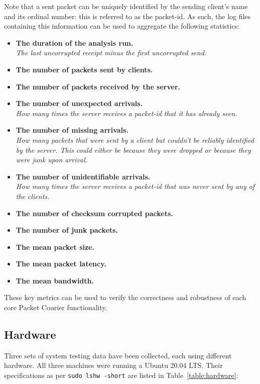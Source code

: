 Note that a sent packet can be uniquely identified by the sending client's name and its ordinal number: this is
referred to as the packet-id. As such, the log files containing this information can be used to aggregate the
following statistics:
\begin{itemize}
    \item \textbf{The duration of the analysis run.} \\
    \emph{The last uncorrupted receipt minus the first uncorrupted send.}
    \item \textbf{The number of packets sent by clients.}
    \item \textbf{The number of packets received by the server.}
    \item \textbf{The number of unexpected arrivals.} \\
    \emph{How many times the server receives a packet-id that it has already seen.}
    \item \textbf{The number of missing arrivals.} \\
    \emph{How many packets that were sent by a client but couldn't be reliably identified by the server. This could
    either be because they were dropped or because they were junk upon arrival.}
    \item \textbf{The number of unidentifiable arrivals.} \\
    \emph{How many times the server receives a packet-id that was never sent by any of the clients.}
    \item \textbf{The number of checksum corrupted packets.}
    \item \textbf{The number of junk packets.}
    \item \textbf{The mean packet size.}
    \item \textbf{The mean packet latency.}
    \item \textbf{The mean bandwidth.}
\end{itemize}

These key metrics can be used to verify the correctness and robustness of each core Packet Courier functionality.

\subsection{Hardware}\label{subsection:hardware}

Three sets of system testing data have been collected, each using different hardware. All three machines were running
a Ubuntu 20.04 LTS\cite{ubuntu_20_04}. Their specifications as per \texttt{sudo lshw -short} are listed in
Table~\ref{table:hardware}:

